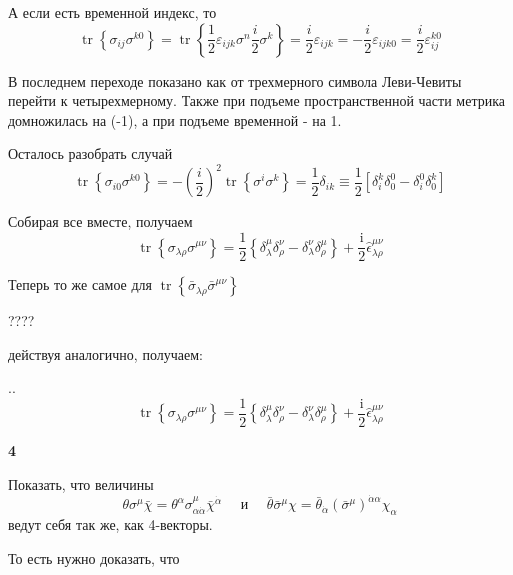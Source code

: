 \documentclass[a4paper,12pt]{article} %
\begin{document}
\begin{task}
А если есть временной индекс, то 
\[ \operatorname{tr}\left\{\sigma_{ij } \sigma^{k0}\right\}=
\operatorname{tr}\left\{\frac{1}{2}\varepsilon_{ijk}\sigma^n \frac{i}{2}\sigma^k\right\}=
\frac{i}{2}\varepsilon_{ijk}=-\frac{i}{2}\varepsilon_{ijk0}=\frac{i}{2}\varepsilon_{ij}^{k0}\]

В последнем переходе показано как от трехмерного символа Леви-Чевиты перейти к четырехмерному.
Также при подъеме пространственной части метрика домножилась на (-1), а при подъеме временной - на 1.

Осталось разобрать случай 
\[ \operatorname{tr}\left\{\sigma_{i0} \sigma^{k0}\right\}=-\left(\frac{i}{2}\right)^2
\operatorname{tr}\left\{\sigma^i\sigma^k\right\}=
\frac{1}{2}\delta_{ik}\equiv 
\frac{1}{2}[\delta_i^k\delta_0^0-\delta_i^0\delta_0^k]\]

Собирая все вместе, получаем
\[ \operatorname{tr}\left\{\sigma_{\lambda \rho} \sigma^{\mu \nu}\right\}=
\frac{1}{2}\left\{\delta_{\lambda}^{\mu} \delta_{\rho}^{\nu}-\delta_{\lambda}^{\nu} \delta_{\rho}^{\mu}\right\}+
\frac{\mathrm{i}}{2} \hat{\epsilon}_{\lambda \rho}^{\mu \nu}
 \]



Теперь то же самое для $ \operatorname{tr}\left\{\bar{\sigma}_{\lambda \rho} \bar{\sigma}^{\mu \nu}\right\} $


????

действуя аналогично, получаем:

..
\[ \operatorname{tr}\left\{\sigma_{\lambda \rho} \sigma^{\mu \nu}\right\}=
\frac{1}{2}\left\{\delta_{\lambda}^{\mu} \delta_{\rho}^{\nu}-\delta_{\lambda}^{\nu} \delta_{\rho}^{\mu}\right\}+
\frac{\mathrm{i}}{2} \hat{\epsilon}_{\lambda \rho}^{\mu \nu}
 \]


\end{task}



\begin{task}\textbf{4}

Показать, что величины
$$
\theta \sigma^{\mu} \bar{\chi}=
\theta^{\alpha} \sigma_{\alpha \dot{\alpha}}^{\mu} \bar{\chi}^{\dot{\alpha}} 
\quad \text { и } \quad 
\bar{\theta} \bar{\sigma}^{\mu} \chi=
\bar{\theta}_{\dot{\alpha}}\left(\bar{\sigma}^{\mu}\right)^{\dot{\alpha} \alpha} \chi_{\alpha}
$$
ведут себя так же, как 4-векторы.

То есть нужно доказать, что






\end{task}
\end{document}
